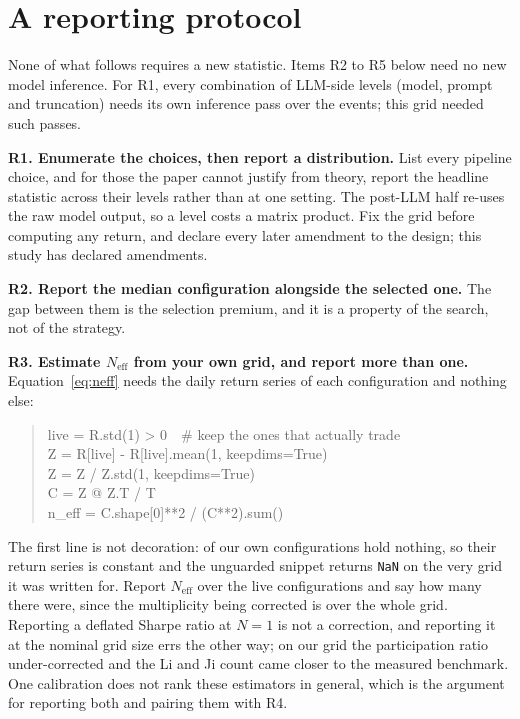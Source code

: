 \documentclass[sigconf]{acmart}
\begin{document}
\section{A reporting protocol}
\label{sec:protocol}

None of what follows requires a new statistic. Items R2 to R5 below need no new model inference. For
R1, every combination of LLM-side levels (model, prompt and truncation) needs its own inference pass
over the events; this grid needed \NumLLMConfigs{} such passes.

\textbf{R1. Enumerate the choices, then report a distribution.} List every pipeline choice, and for
those the paper cannot justify from theory, report the headline statistic across their levels rather
than at one setting. The post-LLM half re-uses the raw model output, so a level costs a matrix
product. Fix the grid before computing any return, and declare every later amendment to the
design; this study has \NumAmendments{} declared amendments.

\textbf{R2. Report the median configuration alongside the selected one.} The gap between them is
the selection premium, and it is a property of the search, not of the strategy.

\textbf{R3. Estimate $N_{\mathrm{eff}}$ from your own grid, and report more than one.}
Equation~\eqref{eq:neff} needs the daily return series of each configuration and nothing else:
\begin{quote}\footnotesize\ttfamily
live = R.std(1) > 0\ \ \# keep the ones that actually trade\\
Z = R[live] - R[live].mean(1, keepdims=True)\\
Z = Z / Z.std(1, keepdims=True)\\
C = Z @ Z.T / T\\
n\_eff = C.shape[0]**2 / (C**2).sum()
\end{quote}
The first line is not decoration: \NumNeverTrades{} of our own configurations hold nothing, so their
return series is constant and the unguarded snippet returns \texttt{NaN} on the very grid it was
written for. Report $N_{\mathrm{eff}}$ over the live configurations and say how many there were,
since the multiplicity being corrected is over the whole grid. Reporting a deflated Sharpe ratio at
$N=1$ is not a correction, and reporting it at the nominal grid size errs the other way; on our grid the participation
ratio under-corrected and the Li and Ji count \cite{li2005adjusting} came closer to the measured
benchmark. One calibration does not rank these estimators in general, which is the argument for
reporting both and pairing them with R4.
\end{document}
